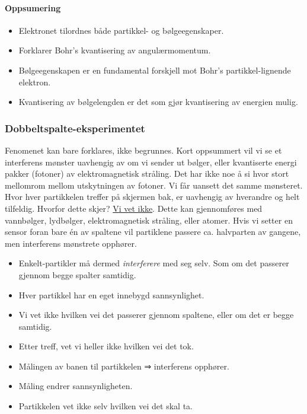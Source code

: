 \paragraph{Oppsumering}
\begin{itemize}
    \item Elektronet tilordnes både partikkel- og bølgeegenskaper. 
    \item Forklarer Bohr's kvantisering av angulærmomentum.
    \item Bølgeegenskapen er en fundamental forskjell mot Bohr's partikkel-lignende elektron. 
    \item Kvantisering av bølgelengden er det som gjør kvantisering av energien mulig. 
\end{itemize}


\subsubsection{Dobbeltspalte-eksperimentet}
Fenomenet kan bare forklares, ikke begrunnes. Kort oppsummert vil vi se et interferens mønster uavhengig av om vi sender ut bølger, eller kvantiserte energi pakker (fotoner) av elektromagnetisk stråling. Det har ikke noe å si hvor stort mellomrom mellom utskytningen av fotoner. Vi får uansett det samme mønsteret. Hvor hver partikkelen treffer på skjermen bak, er uavhengig av hverandre og helt tilfeldig. Hvorfor dette skjer? \underline{Vi vet ikke}. Dette kan gjennomføres med vannbølger, lydbølger, elektromagnetisk stråling, eller atomer. Hvis vi setter en sensor foran bare én av spaltene vil partiklene passere ca. halvparten av gangene, men interferens mønstrete opphører. 

\begin{itemize}
    \item Enkelt-partikler må dermed \textit{interferere} med seg selv. Som om det passerer gjennom begge spalter samtidig. 
    \item Hver partikkel har en eget innebygd sannsynlighet. 
    \item Vi vet ikke hvilken vei det passerer gjennom spaltene, eller om det er begge samtidig. 
    \item Etter treff, vet vi heller ikke hvilken vei det tok.
    \item Målingen av banen til partikkelen ⇒ interferens opphører. 
    \item Måling endrer sannsynligheten. 
    \item Partikkelen vet ikke selv hvilken vei det skal ta. 
\end{itemize}

